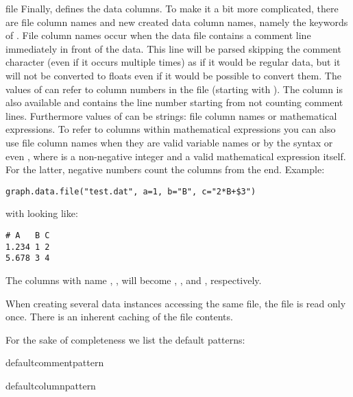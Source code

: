 \begin{classdesc}{file}
  Finally,  defines the data columns. To make it a bit
  more complicated, there are file column names and new created data
  column names, namely the keywords of . File column
  names occur when the data file contains a comment line immediately
  in front of the data. This line will be parsed skipping the comment
  character (even if it occurs multiple times) as if it would be
  regular data, but it will not be converted to floats even if it
  would be possible to convert them. The values of  can
  refer to column numbers in the file (starting with ). The
  column  is also available and contains the line number
  starting from  not counting comment lines. Furthermore
  values of  can be strings: file column names or
  mathematical expressions. To refer to columns within mathematical
  expressions you can also use file column names when they are valid
  variable names or by the syntax  or even , where 
  is a non-negative integer and  a valid mathematical expression itself. For
  the latter, negative numbers count the columns from the end.
  Example:
  \begin{verbatim}
graph.data.file("test.dat", a=1, b="B", c="2*B+$3")
  \end{verbatim}
  with  looking like:
  \begin{verbatim}
# A   B C
1.234 1 2
5.678 3 4
  \end{verbatim}
  The columns with name , ,  will become
  \samp{[1.234, 5.678]}, \samp{[1.0, 3.0]}, and \samp{[4.0, 10.0]},
  respectively.

  When creating several data instances accessing the same file,
  the file is read only once. There is an inherent caching of the
  file contents.
\end{classdesc}

For the sake of completeness we list the default patterns:

\begin{memberdesc}{defaultcommentpattern}
\end{memberdesc}

\begin{memberdesc}{defaultcolumnpattern}
\end{memberdesc}

